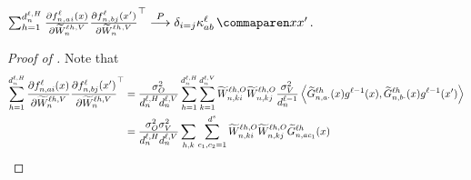\begin{lemma}\label{lem:wv_ntk}
$
    \sum_{\headIndex = 1}^{\headDimension}
        \frac{
            \partial \indexedActivation{\depthSymbol}{\sequenceVariable, \fIndexA i}{\inputSymbol}
        }{
            \partial \uW_\sequenceVariable^{\depthSymbol\headIndex, \valueSymbol}
        }
        \frac{
            \partial \indexedActivation{\depthSymbol}{\sequenceVariable, \fIndexB j}{\inputSymbol'}
        }{
            \partial \uW_\sequenceVariable^{\depthSymbol\headIndex, \valueSymbol}
        }^\top
    \convergeProb
    \delta_{i = j}
    \kernelf{a b}{\depthSymbol}{\inputSymbol}{\inputSymbol'}
    \, .
$
\end{lemma}

\begin{proof}[Proof of ]
    Note that
    \begin{align*}
        \sum_{\headIndex = 1}^{\headDimension}
            \frac{
                \partial \indexedActivation{\depthSymbol}{\sequenceVariable, \fIndexA i}{\inputSymbol}
            }{
                \partial \uW_\sequenceVariable^{\depthSymbol\headIndex, \valueSymbol}
            }
            \frac{
                \partial \indexedActivation{\depthSymbol}{\sequenceVariable, \fIndexB j}{\inputSymbol'}
            }{
                \partial \uW_\sequenceVariable^{\depthSymbol\headIndex, \valueSymbol}
            }^\top
        &=
        \frac{\outVar}{\headDimension \valueDimension}
        \sum_{\headIndex = 1}^{\headDimension}
        \sum_{k = 1}^{\valueDimension}
            \uW_{\sequenceVariable, k i}^{\depthSymbol\headIndex, \outputSymbol}
            \uW_{\sequenceVariable, k j}^{\depthSymbol\headIndex, \outputSymbol}
            \frac{\valueVar}{\layerDimension{\depthSymbol - 1}}
            \left\langle
                \tildeLogitN{\sequenceVariable, \fIndexA \cdot}{\depthSymbol\headIndex}{\inputSymbol}
                \indexedActivity{\depthSymbol - 1}{}{\inputSymbol}
                ,
                \tildeLogitN{\sequenceVariable, \fIndexB \cdot}{\depthSymbol\headIndex}{\inputSymbol}
                \indexedActivity{\depthSymbol - 1}{}{\inputSymbol'}
            \right\rangle
        \\
        &=
        \frac{\outVar\valueVar}{\headDimension \valueDimension}
        \sum_{\headIndex, k}
        \sum_{c_1, c_2 = 1}^{\spatialDimension}
            \uW_{\sequenceVariable, k i}^{\depthSymbol\headIndex, \outputSymbol}
            \uW_{\sequenceVariable, k j}^{\depthSymbol\headIndex, \outputSymbol}
            \tildeLogitN{\sequenceVariable, \fIndexA c_1}{\depthSymbol\headIndex}{\inputSymbol}

\end{align*}
\end{proof}
